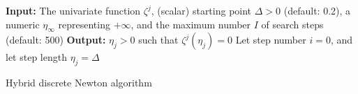 \begin{algorithm}[htbp]
 \textbf{Input:} The univariate function $\zeta^j$, (scalar) starting  point $\Delta > 0$ (default: 0.2), a numeric $\eta_{\infty}$ representing $+\infty$, and the maximum number $I$ of search steps (default: 500)\;
 \textbf{Output:}  $\eta_j > 0$ such that $\zeta^j(\eta_j) = 0$\;
 Let step number $i = 0$, and let step length $\eta_{j}  =\Delta$\;
\caption{Hybrid discrete Newton algorithm}
\label{algo.newton}
\end{algorithm}




